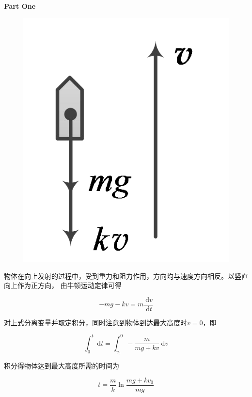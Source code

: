 \documentclass[12pt, a4paper]{article}
\numberwithin{equation}{section}
\begin{document}
    \textbf{Part One}
    \\

    \begin{figure}
        \centering
        \includegraphics[scale=0.3]{"Chapter 02 images/pic4.png"}
        \label{pic4}
    \end{figure}

    物体在向上发射的过程中，受到重力和阻力作用，方向均与速度方向相反。以竖直向上作为正方向，
    由牛顿运动定律可得

    \begin{equation}
        -m g-k v=m \frac{\mathrm{~d} v}{\mathrm{~d} t}
        \label{Problem-2-1}
    \end{equation}

    对上式分离变量并取定积分，同时注意到物体到达最大高度时\(v=0\)，即

    $$
        \int_0^t \mathrm{~d} t=\int_{v_0}^0-\frac{m}{m g+k v} \mathrm{~d} v
    $$

    积分得物体达到最大高度所需的时间为

    $$
        t=\frac{m}{k} \ln \frac{m g+k v_0}{m g}
    $$
\end{document}
